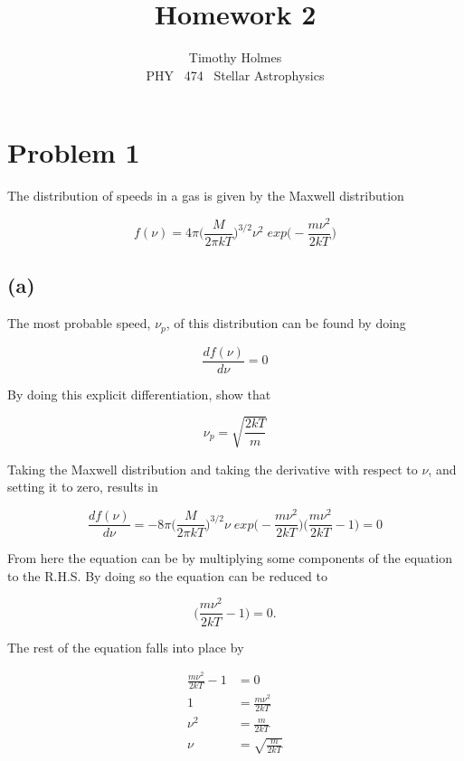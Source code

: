 \documentclass[11pt]{article}
\newcommand{\HWnum}{2}
\newcommand{\CourseNum}{474}           %
\newcommand{\Subject}{PHY}
\begin{document}

\title{Homework {\HWnum}}
\author{Timothy Holmes \\ \Subject ~ \CourseNum ~ Stellar Astrophysics}

\maketitle

\section*{Problem 1}

The distribution of speeds in a gas is given by the Maxwell distribution

$$
f(\nu) = 4\pi\Bigg(\frac{M}{2\pi k T}\Bigg)^{3/2} \nu^{2} \; exp\Bigg( -\frac{m \nu^{2}}{2kT}\Bigg)
$$

\subsection*{(a)}

The most probable speed, $\nu_{p}$, of this distribution can be found by doing

$$
\frac{d f(\nu)}{d\nu} = 0
$$

By doing this explicit differentiation, show that

$$
\nu_{p} = \sqrt{\frac{2kT}{m}}
$$

Taking the Maxwell distribution and taking the derivative with respect to $\nu$, and setting it to zero, results in

$$
\frac{df(\nu)}{d\nu} = -8\pi \Bigg(\frac{M}{2\pi k T}\Bigg)^{3/2} \nu \; exp \Bigg( -\frac{m \nu^{2}}{2kT}\Bigg) \Bigg(\frac{m \nu^{2}}{2kT} - 1\Bigg) = 0
$$

From here the equation can be by multiplying some components of the equation to the R.H.S. By doing so the equation can be reduced to 

$$
\Bigg(\frac{m \nu^{2}}{2kT} - 1\Bigg) = 0.
$$

The rest of the equation falls into place by

\begin{align*}
    \frac{m \nu^{2}}{2kT} - 1 &= 0 \\
    1 &= \frac{m \nu^{2}}{2kT} \\
    \nu^{2} &= \frac{m}{2kT} \\
    \nu &= \sqrt{\frac{m}{2kT}} \\
\end{align*}
\end{document}
